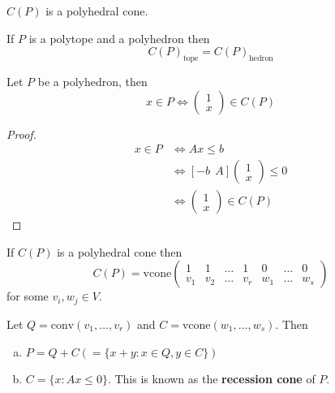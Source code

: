 \documentclass[a4paper,12pt]{amsart}
\begin{document}
\begin{Note}
	$C(P)$ is a polyhedral cone.
\end{Note}

\begin{Remark}
	If $P$ is a polytope and a polyhedron then
	\[C(P)_{\text{tope}} = C(P)_{\text{hedron}}\]
\end{Remark}


 Let $P$ be a polyhedron, then
\[ x\in P \iff \begin{pmatrix} 1 \\ x \end{pmatrix} \in C(P)\]

\begin{proof}
	\begin{align*}
		x \in P &\iff Ax \leq b\\
		&\iff [-b \ \  A] \begin{pmatrix}1\\x \end{pmatrix} \leq 0 \\
		&\iff \begin{pmatrix}1\\x \end{pmatrix} \in C(P)
	\end{align*}
\end{proof}

If $C(P)$ is a polyhedral cone then
\[ C(P) = \text{vcone} \begin{pmatrix} 1 & 1 & \ldots &1 & 0 &\ldots & 0 \\
v_1 & v_2 & \ldots & v_r  & w_1 & \ldots & w_s
\end{pmatrix}\]
for some $v_i, w_j \in V$.

\begin{Theorem}
	Let $Q = \text{conv}(v_1, \ldots, v_r)$ and $C = \text{vcone}(w_1, \ldots, w_s)$.  Then 
	\begin{enumerate}[(a)]
		\item $P = Q+C ( = \{x+y : x\in Q, y \in C\})$
		\item $C = \{ x: Ax \leq 0\}$.  This is known as the {\bf recession cone} of $P$.
	\end{enumerate}
\end{Theorem}
\end{document}
